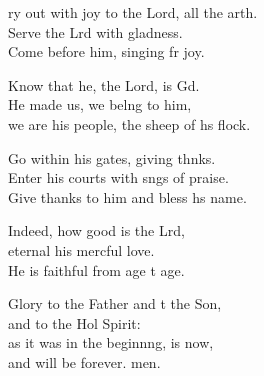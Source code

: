 \begin{psalmverse}
  \begin{patverse}
    ry out with joy to the Lord, all the arth.\Flex\\
Serve the Lrd with gladness.\Med\\
Come before him, singing fr joy.

Know that he, the Lord, is Gd.\Flex\\
He made us, we belng to him,\Med\\
we are his people, the sheep of h\pointup{\i}s flock.

Go within his gates, giving thnks.\Flex\\
Enter his courts with sngs of praise.\Med\\
Give thanks to him and bless h\pointup{\i}s name.

Indeed, how good is the Lrd,\Flex\\
eternal his merc\pointup{\i}ful love.\Med\\
He is faithful from age t age.

Glory to the Father and t the Son,\Med\\
and to the Hol Spirit:\\
as it was in the beginn\pointup{\i}ng, is now,\Med\\
and will be forever. men.
  \end{patverse}
\end{psalmverse}
